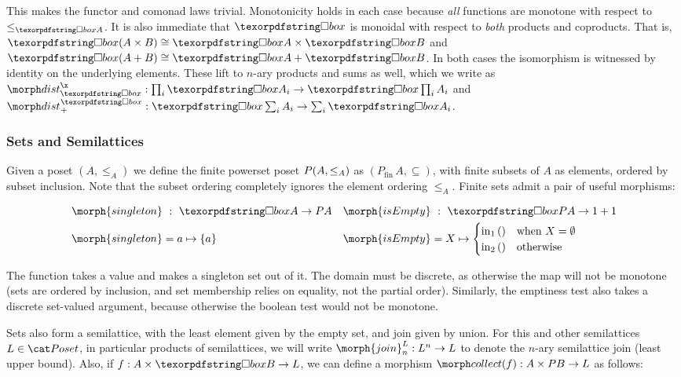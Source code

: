 \noindent
This makes the functor and comonad laws trivial. Monotonicity holds in each case because \emph{all} functions are monotone with respect to $\le_{\iso A}$.
%
It is also immediate that $\iso$ is monoidal with respect to \emph{both}
products and coproducts. That is, $\iso (A \times B) \cong \iso A \times \iso B$
and $\iso (A + B) \cong \iso A + \iso B$.
%
In both cases the isomorphism is witnessed by identity on the underlying
elements.
%
These lift to $n$-ary products and sums as well, which we write as $\isox : \prod_i \iso A_i \to \iso\prod_i A_i$ and $\isosum : \iso \sum_i
A_i \to \sum_i \iso A_i$.


\subsubsection{Sets and Semilattices}

Given a poset $(A, \leq_A)$ we define the finite powerset poset $P (A,
\leq_A)$ as $(P_{\mathrm{fin}}\, A, \subseteq)$, with finite subsets of $A$ as
elements, ordered by subset inclusion.
%
Note that the subset ordering completely ignores the element ordering $\leq_A$.
%
Finite sets admit a pair of useful morphisms:

\begin{align*}
  \morph{singleton} &\isa \iso A \to \pfinof A
  &
  \morph{isEmpty} &\isa \iso \pfinof A \to \termO + \termO
  \\
  \morph{singleton} &= a \mapsto \{a\}
  &
  \morph{isEmpty} &= X \mapsto 
  \begin{cases}
    \inj 1 () &\text{when }X = \emptyset\\
    \inj 2 () &\text{otherwise}
  \end{cases}
\end{align*}

\noindent
The  function takes a value and makes a singleton set out of
it. The domain must be discrete, as otherwise the map will not be monotone (sets
are ordered by inclusion, and set membership relies on equality, not the partial
order). Similarly, the emptiness test  also takes a discrete
set-valued argument, because otherwise the boolean test would not be monotone.

Sets also form a semilattice, with the least element given by the empty set, and
join given by union.
%
For this and other semilattices $L \in \Poset$, in particular products of
semilattices, we will write $\morph{join}^L_n : L^n \to L$ to denote the $n$-ary
semilattice join (least upper bound).
%
Also, if $f : A \times \iso B \to L$, we can define a morphism
$\pcollect{f} : A \times \pfinof{B} \to L$ as follows:

